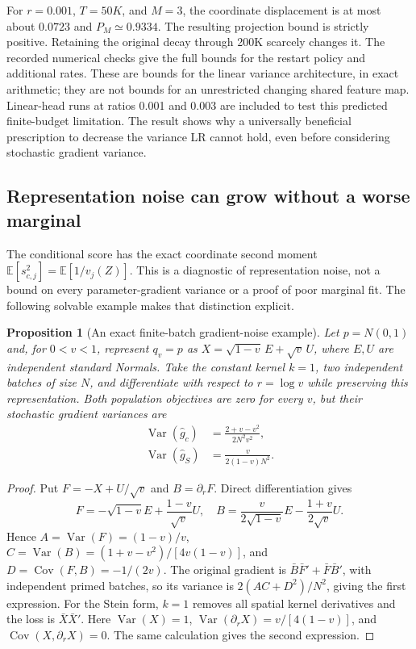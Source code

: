 \documentclass[11pt,a4paper]{article}
\newtheorem{proposition}{Proposition}[section]
\newcommand{\E}{\mathbb E}
\newcommand{\Var}{\operatorname{Var}}
\newcommand{\Cov}{\operatorname{Cov}}
\begin{document}
For $r=0.001$, $T=50K$, and $M=3$, the coordinate displacement is at most
about $0.0723$ and $P_M\simeq0.9334$. The resulting projection bound is
strictly positive. Retaining the original decay through 200K scarcely changes
it. The recorded numerical checks give the full bounds for the restart policy
and additional rates. These are bounds for the linear variance architecture,
in exact arithmetic; they are not bounds for an unrestricted changing shared
feature map. Linear-head runs at ratios 0.001 and 0.003 are included to test
this predicted finite-budget limitation. The result shows why a universally
beneficial prescription to decrease the variance LR cannot hold, even before
considering stochastic gradient variance.

\subsection{Representation noise can grow without a worse marginal}
The conditional score has the exact coordinate second moment
$\E[s_{c,j}^2]=\E[1/v_j(Z)]$. This is a diagnostic of representation noise,
not a bound on every parameter-gradient variance or a proof of poor marginal
fit. The following solvable example makes that distinction explicit.

\begin{proposition}[An exact finite-batch gradient-noise example]
Let $p=N(0,1)$ and, for $0<v<1$, represent $q_v=p$ as
$X=\sqrt{1-v}\,E+\sqrt v\,U$, where $E,U$ are independent standard Normals.
Take the constant kernel $k=1$, two independent batches of size $N$, and
differentiate with respect to $r=\log v$ while preserving this representation.
Both population objectives are zero for every $v$, but their stochastic
gradient variances are
\begin{align}
 \Var(\widehat g_c)&=\frac{2+v-v^2}{2N^2v^2},\\
 \Var(\widehat g_S)&=\frac{v}{2(1-v)N^2}.
 \label{eq:proxy}
\end{align}
\end{proposition}
\begin{proof}
Put $F=-X+U/\sqrt v$ and $B=\partial_rF$. Direct differentiation gives
\[
 F=-\sqrt{1-v}E+\frac{1-v}{\sqrt v}U,\quad
 B=\frac{v}{2\sqrt{1-v}}E-\frac{1+v}{2\sqrt v}U.
\]
Hence $A=\Var(F)=(1-v)/v$,
$C=\Var(B)=(1+v-v^2)/[4v(1-v)]$, and
$D=\Cov(F,B)=-1/(2v)$. The original gradient is
$\bar B\bar F'+\bar F\bar B'$, with independent primed batches, so its
variance is $2(AC+D^2)/N^2$, giving the first expression.
For the Stein form, $k=1$ removes all spatial kernel derivatives and the loss
is $\bar X\bar X'$. Here $\Var(X)=1$,
$\Var(\partial_rX)=v/[4(1-v)]$, and
$\Cov(X,\partial_rX)=0$. The same calculation gives the second expression.
\end{proof}
\end{document}
